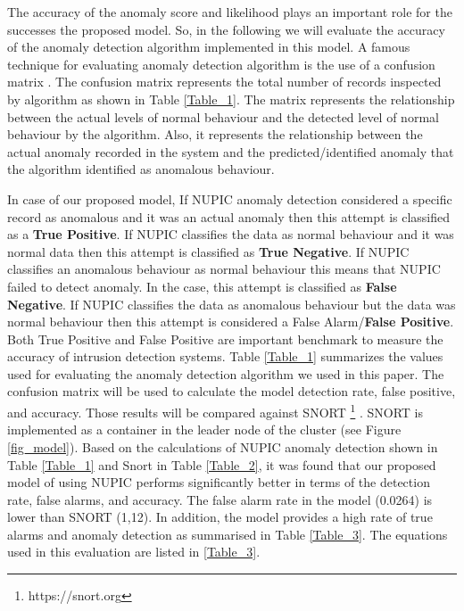 \documentclass{ieeeaccess}
\begin{document}
The accuracy of the anomaly score and likelihood plays an important role for the successes the proposed model. So, in the following we will evaluate the accuracy of the anomaly detection algorithm implemented in this model. A famous technique for evaluating anomaly detection algorithm is the use of a confusion matrix \cite{kohavi1998confusion}. The confusion matrix represents the total number of records inspected by algorithm as shown in Table \ref{Table_1}. The matrix represents the relationship between the actual levels of normal behaviour and the detected level of normal behaviour by the algorithm. Also, it represents the relationship between the actual anomaly recorded in the system and the predicted/identified anomaly that the algorithm identified as anomalous behaviour.   


In case of our proposed model, If NUPIC anomaly detection considered a specific record as anomalous and it was an actual anomaly then this attempt is classified as a \textbf{True Positive}. If NUPIC classifies the data as normal behaviour and it was normal data then this attempt is classified as \textbf{True Negative}. If NUPIC classifies an anomalous behaviour as normal behaviour this means that NUPIC failed to detect anomaly. In the case, this attempt is classified as \textbf{False Negative}. If NUPIC classifies the data as anomalous behaviour but the data was normal behaviour then this attempt is considered a False Alarm/\textbf{False Positive}. Both True Positive and False Positive are important benchmark to measure the accuracy of intrusion detection systems. Table \ref{Table_1} summarizes the values used for evaluating the anomaly detection algorithm we used in this paper. The confusion matrix will be used to calculate the model detection rate, false positive, and accuracy. Those results will be compared against SNORT \footnote{https://snort.org} \cite{roesch1999snort}. SNORT is implemented as a container in the leader node of the cluster (see Figure \ref{fig_model}). Based on the calculations of NUPIC anomaly detection shown in Table \ref{Table_1} and Snort in Table \ref{Table_2}, it was found that our proposed model of using NUPIC performs significantly better in terms of the detection rate, false alarms, and accuracy. The false alarm rate in the model (0.0264) is lower than SNORT (1,12). In addition, the model provides a high rate of true alarms and anomaly detection as summarised in Table \ref{Table_3}. The equations used in this evaluation are listed in \ref{Table_3}.    
 
\end{document}
